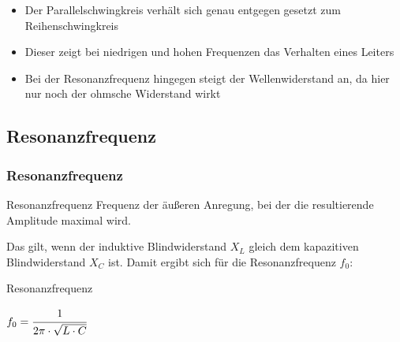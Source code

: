 \begin{frame}
\begin{center}
\begin{minipage}{0.49\textwidth}
\begin{figure}
      \end{figure}
    \end{minipage}
  \end{center}
  \begin{itemize}
    \item Der Parallelschwingkreis verhält sich genau entgegen gesetzt zum Reihenschwingkreis
    \item Dieser zeigt bei niedrigen und hohen Frequenzen das Verhalten eines Leiters
    \item Bei der Resonanzfrequenz hingegen steigt der Wellenwiderstand an, da hier nur noch der ohmsche Widerstand wirkt
  \end{itemize}
\end{frame}

\subsection*{Resonanz\-frequenz}
\begin{frame}
  \frametitle{Resonanzfrequenz}
  \begin{block}{Resonanzfrequenz}
    Frequenz der äußeren Anregung, bei der die resultierende Amplitude maximal wird.
  \end{block}

  Das gilt, wenn der induktive Blindwiderstand $X_L$ gleich dem kapazitiven Blindwiderstand $X_C$ ist. Damit ergibt sich für die Resonanzfrequenz $f_0$:
  \begin{block}{Resonanzfrequenz}
    \begin{center}
      $f_0 = \cfrac{1}{2\pi \cdot \sqrt{L \cdot C}}$
    \end{center}
  \end{block}
\end{frame}

